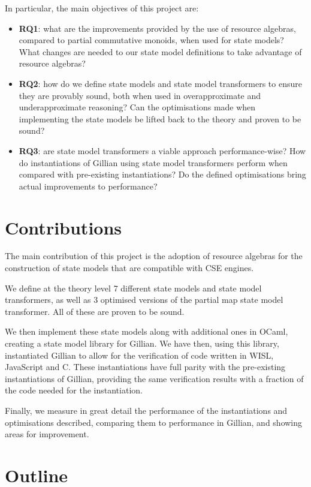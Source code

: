 In particular, the main objectives of this project are: \begin{itemize}
	\item \textbf{RQ1}: what are the improvements provided by the use of resource algebras, compared to partial commutative monoids, when used for state models? What changes are needed to our state model definitions to take advantage of resource algebras?
	\item \textbf{RQ2}: how do we define state models and state model transformers to ensure they are provably sound, both when used in overapproximate and underapproximate reasoning? Can the optimisations made when implementing the state models be lifted back to the theory and proven to be sound?
	\item \textbf{RQ3}: are state model transformers a viable approach performance-wise? How do instantiations of Gillian using state model transformers perform when compared with pre-existing instantiations? Do the defined optimisations bring actual improvements to performance?
\end{itemize}

\section{Contributions}

The main contribution of this project is the adoption of resource algebras for the construction of state models that are compatible with CSE engines.

We define at the theory level 7 different state models and state model transformers, as well as 3 optimised versions of the partial map state model transformer. All of these are proven to be sound.

We then implement these state models along with additional ones in OCaml, creating a state model library for Gillian. We have then, using this library, instantiated Gillian to allow for the verification of code written in WISL, JavaScript and C. These instantiations have full parity with the pre-existing instantiations of Gillian, providing the same verification results with a fraction of the code needed for the instantiation.

Finally, we measure in great detail the performance of the instantiations and optimisations described, comparing them to performance in Gillian, and showing areas for improvement.

\section{Outline}


